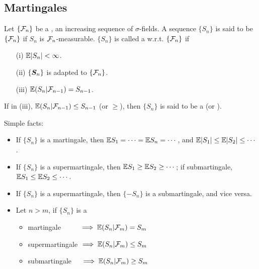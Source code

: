 \documentclass[10pt,a4paper]{article}
\begin{document}
\subsection{Martingales}\label{sec:martingale}
\begin{defbox}
	\begin{definition}\label{def:martingale}
		Let $\{\calF_n\}$ be a , an increasing sequence of $\sigma$-fields. A sequence $\{S_n\}$ is said to be  $\{\calF_n\}$ if $S_n$ is $\calF_n$-measurable. $\{S_n\}$ is called a  w.r.t. $\{\calF_n\}$ if 
		\begin{enumerate}
			\item[(i)] $\bbE|S_n|<\infty $.
			\item[(ii)] $\{\S_n\}$ is adapted to $\{\calF_n\}$.     
			\item[(iii)] $\bbE(S_n|\calF_{n-1})=S_{n-1}$.  
		\end{enumerate}     
		If in (iii), $\bbE(S_n|\calF_{n-1})\leq S_{n-1}$ (or $\geq $), then $\{S_n\}$ is said to be a  (or ).  
	\end{definition}
\end{defbox}
\noindent Simple facts:
\begin{itemize}
	\item If $\{S_n\}$ is a martingale, then $\bbE S_1=\cdots=\bbE S_n =\cdots$, and $\bbE|S_1|\leq\bbE|S_2|\leq\cdots$. 
	\item If $\{S_n\}$ is a supermartingale, then $\bbE S_1\geq\bbE S_{2}\geq \cdots$; if submartingale, $\bbE S_1\leq\bbE S_2\leq\cdots$.
	\item If $\{S_n\}$ is a supermartingale, then $\{-S_n\}$ is a submartingale, and vice versa. 
	\item Let $n>m$, if $\{S_n\}$ is a 
	\begin{itemize}
		\item martingale $\quad \quad \ \implies \bbE(S_n|\calF_m)=S_m$
		\item supermartingale $\implies \bbE(S_n|\calF_m)\leq S_m$
		\item submartingale $\quad   \implies \bbE(S_n|\calF_m)\geq S_m$
	\end{itemize}  
\end{itemize}
\end{document}
